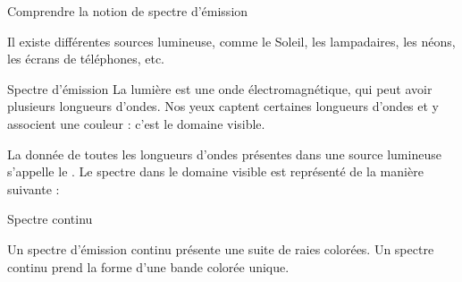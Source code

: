 \sndEnTeteQuatre

\vspace*{-36pt}


\begin{objectifs}
  \item Comprendre la notion de spectre d'émission
\end{objectifs}

\begin{contexte}
  Il existe différentes sources lumineuse, comme le Soleil, les lampadaires, les néons, les écrans de téléphones, etc.
  
\end{contexte}

\vspace*{-12pt}
\vspace*{-12pt}


\begin{doc}{Spectre d'émission}
  La lumière est une onde électromagnétique, qui peut avoir plusieurs longueurs d'ondes.
  Nos yeux captent certaines longueurs d'ondes et y associent une couleur : c'est le domaine visible.
  
  \begin{encart}
    La donnée de toutes les longueurs d'ondes présentes dans une source lumineuse s'appelle le .
    Le spectre dans le domaine visible est représenté de la manière suivante :
  \end{encart}
  \vspace{-22pt}
  \begin{center}
  \end{center}
\end{doc}

\vspace*{-12pt}
\vspace*{-12pt}

\begin{doc}{Spectre continu}
  \vspace*{-24pt}
  \begin{encart}
    Un spectre d'émission continu présente une suite de raies colorées.
    Un spectre continu prend la forme d'une bande colorée unique.
  \end{encart}
\end{doc}
  

